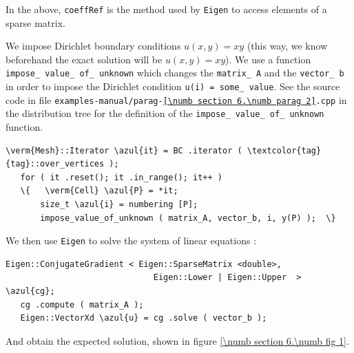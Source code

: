 In the above, {\small\tt coeffRef} is the method used by {\small\tt Eigen} to access elements of
a sparse matrix.

We impose Dirichlet boundary conditions $ u(x,y) = xy $ (this way, we know beforehand
the exact solution will be $ u(x,y) = xy $).
We use a function {\small\tt impose\_\,value\_\,of\_\,unknown} which changes the {\small\tt matrix\_\,A}
and the {\small\tt vector\_\,b} in order to impose the Dirichlet condition {\small\tt u(i) = 
some\_\,value}.
See the source code in file {\small\tt examples-manual/parag-\ref{\numb section 6.\numb parag 2}.cpp}
in the distribution tree for the definition of the {\small\tt impose\_\,value\_\,of\_\,unknown}
function.

\begin{Verbatim}[commandchars=\\\{\},formatcom=\small\tt,frame=single,
   label=parag-\ref{\numb section 6.\numb parag 2}.cpp,rulecolor=\color{coment},
   baselinestretch=0.94,framesep=2mm                                            ]
   \verm{Mesh}::Iterator \azul{it} = BC .iterator ( \textcolor{tag}{tag}::over_vertices );
   for ( it .reset(); it .in_range(); it++ )
   \{   \verm{Cell} \azul{P} = *it;
       size_t \azul{i} = numbering [P];
       impose_value_of_unknown ( matrix_A, vector_b, i, y(P) );  \}
\end{Verbatim}
\vfil\eject

We then use {\small\tt Eigen} to solve the system of linear equations :

\begin{Verbatim}[commandchars=\\\{\},formatcom=\small\tt,frame=single,
   label=parag-\ref{\numb section 6.\numb parag 2}.cpp,rulecolor=\color{coment},
   baselinestretch=0.94,framesep=2mm                                            ]
   Eigen::ConjugateGradient < Eigen::SparseMatrix <double>,
                              Eigen::Lower | Eigen::Upper  > \azul{cg};
   cg .compute ( matrix_A );
   Eigen::VectorXd \azul{u} = cg .solve ( vector_b );
\end{Verbatim}

And obtain the expected solution, shown in figure \ref{\numb section 6.\numb fig 1}.

